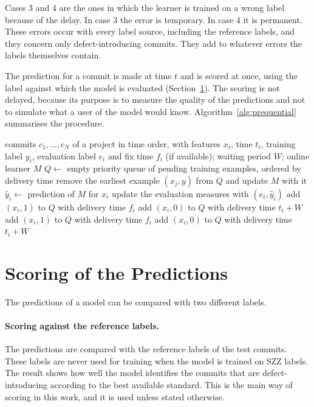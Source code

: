 \documentclass[12pt,a4paper,oneside]{report}
\begin{document}
Cases 3 and 4 are the ones in which the learner is trained on a wrong label
because of the delay. In case 3 the error is temporary. In case 4 it is
permanent. These errors occur with every label source, including the
reference labels, and they concern only defect-introducing commits. They add
to whatever errors the labels themselves contain.

The prediction for a commit is made at time $t$ and is scored at once, using
the label against which the model is evaluated (Section~\ref{sec:scoring}).
The scoring is not delayed, because its purpose is to measure the quality of
the predictions and not to simulate what a user of the model would know.
Algorithm~\ref{alg:prequential} summarises the procedure.

\begin{algorithm}[htbp]
\caption{Prequential evaluation with verification latency}
\label{alg:prequential}
\begin{algorithmic}[1]
\Require commits $c_1,\dots,c_N$ of a project in time order, with features
$x_i$, time $t_i$, training label $y_i$, evaluation label $e_i$ and fix time
$f_i$ (if available); waiting period $W$; online learner $M$
\State $Q \gets$ empty priority queue of pending training examples, ordered by delivery time
    \State remove the earliest example $(x_j, y)$ from $Q$ and update $M$ with it
  \EndWhile
  \State $\hat{y}_i \gets$ prediction of $M$ for $x_i$
  \State update the evaluation measures with $(e_i, \hat{y}_i)$
      \State add $(x_i, 1)$ to $Q$ with delivery time $f_i$
    \Else
      \State add $(x_i, 0)$ to $Q$ with delivery time $t_i + W$
      \State add $(x_i, 1)$ to $Q$ with delivery time $f_i$
    \EndIf
  \Else
    \State add $(x_i, 0)$ to $Q$ with delivery time $t_i + W$
  \EndIf
\EndFor
\end{algorithmic}
\end{algorithm}

\section{Scoring of the Predictions}\label{sec:scoring}

The predictions of a model can be compared with two different labels.

\paragraph{Scoring against the reference labels.} The predictions are
compared with the reference labels of the test commits. These labels are
never used for training when the model is trained on SZZ labels. The result
shows how well the model identifies the commits that are defect-introducing
according to the best available standard. This is the main way of scoring in
this work, and it is used unless stated otherwise.
\end{document}
